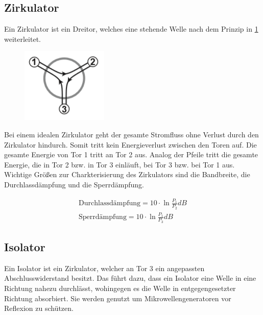 \subsection{Zirkulator}
Ein Zirkulator ist ein Dreitor, welches eine stehende Welle nach dem Prinzip in \cref{ZB} weiterleitet.
\begin{figure}[h!]
	\centering
	\includegraphics[scale = 1]{Zirk-Bild.PNG}
	\caption{}
	\label{ZB}
\end{figure}
Bei einem idealen Zirkulator geht der gesamte Stromfluss ohne Verlust  durch den Zirkulator hindurch. Somit tritt kein Energieverlust zwischen den Toren auf. Die gesamte Energie von Tor 1 tritt an Tor 2 aus. Analog der Pfeile tritt die gesamte Energie, die in Tor 2 bzw. in Tor 3 einläuft, bei Tor 3 bzw. bei Tor 1 aus. Wichtige Größen zur Charkterisierung des Zirkulators sind die Bandbreite, die Durchlassdämpfung und die Sperrdämpfung.

\begin{align}
\text{Durchlassdämpfung} = 10 \cdot \ln{\frac{P_1}{P_2}}dB \\
\text{Sperrdämpfung} =  10 \cdot \ln{\frac{P_1}{P_3}}dB 
\end{align}

\subsection{Isolator}
Ein Isolator ist ein Zirkulator, welcher an Tor 3 ein angepassten Abschlusswiderstand besitzt. Das führt dazu, dass ein Isolator eine Welle in eine Richtung nahezu durchlässt, wohingegen es die Welle in entgegengesetzter Richtung absorbiert. Sie werden genutzt um Mikrowellengeneratoren vor Reflexion zu schützen.

